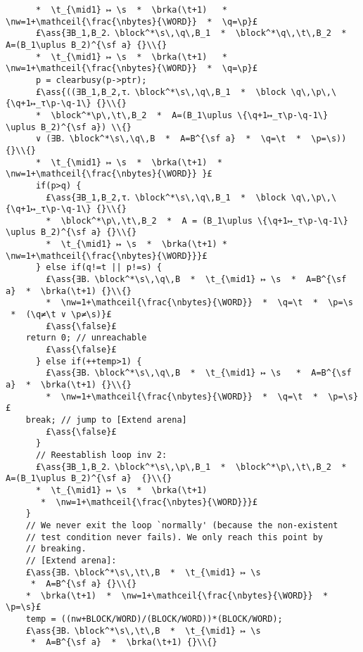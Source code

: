 \documentclass[12pt,a4paper]{article}
\makeatletter
\newcommand{\ml}[2][t]{\mbox{\mdseries\begin{tabular}[#1]{@{}L@{}}#2\end{tabular}}}
\newcommand{\ass}[1]{\ensuremath{{\color{blue}\left\{\ml[c]{#1}\right\}}}}
\newcommand{\block}{\mathop{\emph{block}}}
\newcommand{\s}{{\tt s}}
\renewcommand{\t}{{\tt t}}
\newcommand{\p}{{\tt p}}
\newcommand{\q}{{\tt q}}
\newcommand{\brka}{\mathop{\emph{brka}}}
\newcommand{\nw}{{\tt nw}}
\newcommand{\nbytes}{{\tt nbytes}}
\newcommand{\WORD}{{\tt WORD}}
\newcommand{\mathceil}[1]{\left\lceil#1\right\rceil}
\makeatother
\begin{document}
\begin{lstlisting}
      *  \t_{\mid1} ↦ \s  *  \brka(\t+1)   *  \nw=1+\mathceil{\frac{\nbytes}{\WORD}}  *  \q=\p}£
      £\ass{∃B_1,B_2．\block^*\s\,\q\,B_1  *  \block^*\q\,\t\,B_2  *  A=(B_1\uplus B_2)^{\sf a} {}\\{}
      *  \t_{\mid1} ↦ \s  *  \brka(\t+1)   *  \nw=1+\mathceil{\frac{\nbytes}{\WORD}}  *  \q=\p}£
      p = clearbusy(p->ptr);
      £\ass{((∃B_1,B_2,τ．\block^*\s\,\q\,B_1  *  \block \q\,\p\,\{\q+1↦_τ\p-\q-1\} {}\\{} 
      *  \block^*\p\,\t\,B_2  *  A=(B_1\uplus \{\q+1↦_τ\p-\q-1\} \uplus B_2)^{\sf a}) \\{}
      ∨ (∃B．\block^*\s\,\q\,B  *  A=B^{\sf a}  *  \q=\t  *  \p=\s)) {}\\{}
      *  \t_{\mid1} ↦ \s  *  \brka(\t+1)  *  \nw=1+\mathceil{\frac{\nbytes}{\WORD}} }£
      if(p>q) {
        £\ass{∃B_1,B_2,τ．\block^*\s\,\q\,B_1  *  \block \q\,\p\,\{\q+1↦_τ\p-\q-1\} {}\\{}
        *  \block^*\p\,\t\,B_2  *  A = (B_1\uplus \{\q+1↦_τ\p-\q-1\} \uplus B_2)^{\sf a} {}\\{}
        *  \t_{\mid1} ↦ \s  *  \brka(\t+1) *  \nw=1+\mathceil{\frac{\nbytes}{\WORD}}}£
      } else if(q!=t || p!=s) {
        £\ass{∃B．\block^*\s\,\q\,B  *  \t_{\mid1} ↦ \s  *  A=B^{\sf a}  *  \brka(\t+1) {}\\{}
        *  \nw=1+\mathceil{\frac{\nbytes}{\WORD}}  *  \q=\t  *  \p=\s  *  (\q≠\t ∨ \p≠\s)}£
        £\ass{\false}£
	return 0; // unreachable
        £\ass{\false}£
      } else if(++temp>1) {
        £\ass{∃B．\block^*\s\,\q\,B  *  \t_{\mid1} ↦ \s   *  A=B^{\sf a}  *  \brka(\t+1) {}\\{}
        *  \nw=1+\mathceil{\frac{\nbytes}{\WORD}}  *  \q=\t  *  \p=\s}£
	break; // jump to [Extend arena]
        £\ass{\false}£
      } 
      // Reestablish loop inv 2:     
      £\ass{∃B_1,B_2．\block^*\s\,\p\,B_1  *  \block^*\p\,\t\,B_2  *  A=(B_1\uplus B_2)^{\sf a}  {}\\{} 
      *  \t_{\mid1} ↦ \s  *  \brka(\t+1)
       *  \nw=1+\mathceil{\frac{\nbytes}{\WORD}}}£
    }
    // We never exit the loop `normally' (because the non-existent 
    // test condition never fails). We only reach this point by 
    // breaking.
    // [Extend arena]:
    £\ass{∃B．\block^*\s\,\t\,B  *  \t_{\mid1} ↦ \s 
     *  A=B^{\sf a} {}\\{}
    *  \brka(\t+1)  *  \nw=1+\mathceil{\frac{\nbytes}{\WORD}}  *  \p=\s}£
    temp = ((nw+BLOCK/WORD)/(BLOCK/WORD))*(BLOCK/WORD); 
    £\ass{∃B．\block^*\s\,\t\,B  *  \t_{\mid1} ↦ \s 
     *  A=B^{\sf a}  *  \brka(\t+1) {}\\{}

\end{lstlisting}
\end{document}

